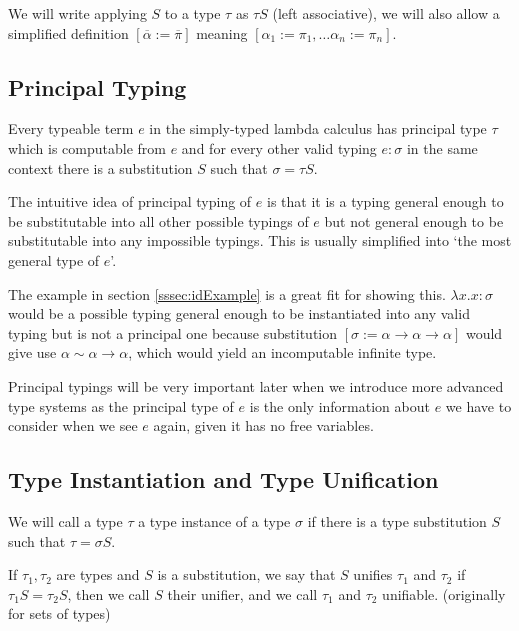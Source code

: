 We will write applying $S$ to a type $\tau$ as $\tau S$ (left associative), we will also allow a simplified definition $[\overline{\alpha} := \overline{\pi}]$ meaning $[\alpha_1 := \pi_1, \dots \alpha_n := \pi_n]$.

\subsection{Principal Typing}

Every typeable term $e$ in the simply-typed lambda calculus has principal type $\tau$ \cite{barendregt1992lambda} which is computable from $e$ and for every other valid typing $e : \sigma$ in the same context there is a substitution $S$ such that $\sigma = \tau S$.

The intuitive idea of principal typing of $e$ is that it is a typing general enough to be substitutable into all other possible typings of $e$ but not general enough to be substitutable into any impossible typings. This is usually simplified into `the most general type of $e$'.

The example in section \ref{sssec:idExample} is a great fit for showing this. $\lambda x . x : \sigma$ would be a possible typing general enough to be instantiated into any valid typing but is not a principal one because substitution $[\sigma := \alpha \rightarrow \alpha \rightarrow \alpha]$ would give use $\alpha \sim \alpha \rightarrow \alpha$, which would yield an incomputable infinite type.

Principal typings will be very important later when we introduce more advanced type systems as the principal type of $e$ is the only information about $e$ we have to consider when we see $e$ again, given it has no free variables.

\subsection{Type Instantiation and Type Unification}

\begin{defn}
    \label{defn:typeInstance}
    We will call a type $\tau$ a type instance of a type $\sigma$ if there is a type substitution $S$ such that $\tau = \sigma S$.
\end{defn}

\begin{defn}
    \label{defn:unifier}
    If $\tau_1, \tau_2$ are types and $S$ is a substitution, we say that $S$ unifies $\tau_1$ and $\tau_2$ if $\tau_1 S = \tau_2 S$, then we call $S$ their unifier, and we call $\tau_1$ and $\tau_2$ unifiable. \cite{robinson1965machine} (originally for sets of types)
\end{defn}

